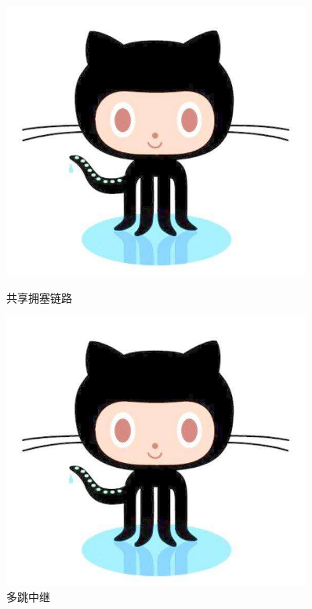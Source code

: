 \documentclass[winfonts,bachelor,oneside,nobackinfo]{njuthesis}
\begin{document}
\begin{figure}[htbp]
\begin{minipage}[t]{0.5\textwidth}
\centering
\includegraphics[width=0.9\textwidth]{./pictures/github.jpg}
\caption{共享拥塞链路}
\label{lab:1}
\end{minipage}%
\begin{minipage}[t]{0.5\textwidth}
\centering
\includegraphics[width=0.9\textwidth]{./pictures/github.jpg}
\caption{多跳中继}
\label{lab:2}
\end{minipage}
\end{figure}
\end{document}
